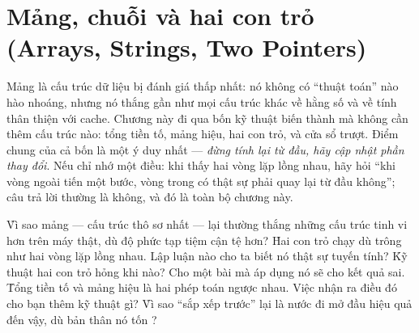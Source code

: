 \documentclass[../../algorithm.tex]{subfiles}
\begin{document}
\chapter{Mảng, chuỗi và hai con trỏ (Arrays, Strings, Two Pointers)}

\begin{tomtat}
Mảng là cấu trúc dữ liệu bị đánh giá thấp nhất: nó không có ``thuật toán'' nào hào nhoáng, nhưng nó thắng gần như mọi cấu trúc khác về hằng số và về tính thân thiện với cache. Chương này đi qua bốn kỹ thuật biến  thành  mà không cần thêm cấu trúc nào: tổng tiền tố, mảng hiệu, hai con trỏ, và cửa sổ trượt. Điểm chung của cả bốn là một ý duy nhất --- \emph{đừng tính lại từ đầu, hãy cập nhật phần thay đổi}. Nếu chỉ nhớ một điều: khi thấy hai vòng lặp lồng nhau, hãy hỏi ``khi vòng ngoài tiến một bước, vòng trong có thật sự phải quay lại từ đầu không''; câu trả lời thường là không, và đó là toàn bộ chương này.
\end{tomtat}

\begin{nentang}
\end{nentang}

\begin{khoigoi}
\h{Vì sao mảng --- cấu trúc thô sơ nhất --- lại thường thắng những cấu trúc tinh vi hơn trên máy thật, dù độ phức tạp tiệm cận tệ hơn?}
\h{Hai con trỏ chạy  dù trông như hai vòng lặp lồng nhau. Lập luận nào cho ta biết nó thật sự tuyến tính?}
\h{Kỹ thuật hai con trỏ hỏng khi nào? Cho một bài mà áp dụng nó sẽ cho kết quả sai.}
\h{Tổng tiền tố và mảng hiệu là hai phép toán ngược nhau. Việc nhận ra điều đó cho bạn thêm kỹ thuật gì?}
\h{Vì sao ``sắp xếp trước'' lại là nước đi mở đầu hiệu quả đến vậy, dù bản thân nó tốn ?}
\end{khoigoi}
\end{document}
